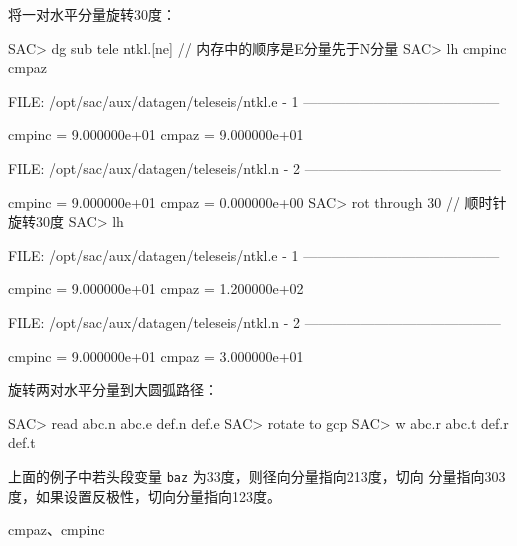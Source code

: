 将一对水平分量旋转30度：
\begin{SACCode}
SAC> dg sub tele ntkl.[ne]          // 内存中的顺序是E分量先于N分量
SAC> lh cmpinc cmpaz

  FILE: /opt/sac/aux/datagen/teleseis/ntkl.e - 1
 ------------------------------------------

     cmpinc = 9.000000e+01
      cmpaz = 9.000000e+01

  FILE: /opt/sac/aux/datagen/teleseis/ntkl.n - 2
 ------------------------------------------

     cmpinc = 9.000000e+01
      cmpaz = 0.000000e+00
SAC> rot through 30                 // 顺时针旋转30度
SAC> lh

  FILE: /opt/sac/aux/datagen/teleseis/ntkl.e - 1
 ------------------------------------------

     cmpinc = 9.000000e+01
      cmpaz = 1.200000e+02

  FILE: /opt/sac/aux/datagen/teleseis/ntkl.n - 2
 ------------------------------------------

     cmpinc = 9.000000e+01
      cmpaz = 3.000000e+01
\end{SACCode}

旋转两对水平分量到大圆弧路径：
\begin{SACCode}
SAC> read abc.n abc.e def.n def.e
SAC> rotate to gcp
SAC> w abc.r abc.t def.r def.t
\end{SACCode}
上面的例子中若头段变量 \texttt{baz} 为33度，则径向分量指向213度，切向
分量指向303度，如果设置反极性，切向分量指向123度。

cmpaz、cmpinc
